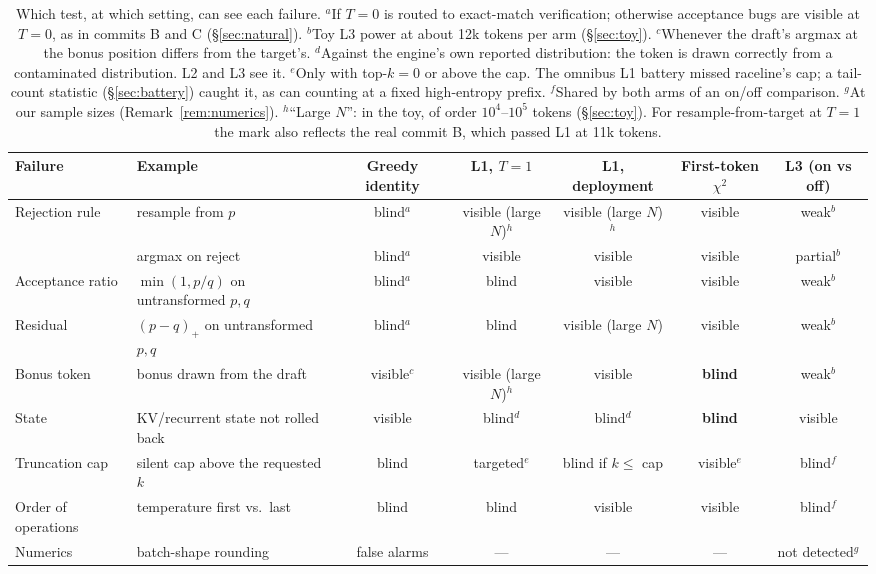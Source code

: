 \documentclass[10pt]{article}
\theoremstyle{remark}
\begin{document}
\begin{table}[h]
\centering\small
\begin{tabular}{llccccc}
\toprule
Failure & Example & Greedy identity & L1, $T{=}1$ & L1, deployment & First-token $\chi^2$ & L3 (on vs off) \\
\midrule
Rejection rule & resample from $p$ & blind$^a$ & visible (large $N$)$^h$ & visible (large $N$)$^h$ & visible & weak$^b$ \\
 & argmax on reject & blind$^a$ & visible & visible & visible & partial$^b$ \\
Acceptance ratio & $\min(1,p/q)$ on untransformed $p,q$ & blind$^a$ & blind & visible & visible & weak$^b$ \\
Residual & $(p-q)_+$ on untransformed $p,q$ & blind$^a$ & blind & visible (large $N$) & visible & weak$^b$ \\
Bonus token & bonus drawn from the draft & visible$^c$ & visible (large $N$)$^h$ & visible & \textbf{blind} & weak$^b$ \\
State & KV/recurrent state not rolled back & visible & blind$^d$ & blind$^d$ & \textbf{blind} & visible \\
Truncation cap & silent cap above the requested $k$ & blind & targeted$^e$ & blind if $k\le$ cap & visible$^e$ & blind$^f$ \\
Order of operations & temperature first vs.\ last & blind & blind & visible & visible & blind$^f$ \\
Numerics & batch-shape rounding & false alarms & --- & --- & --- & not detected$^g$ \\
\bottomrule
\end{tabular}
\caption{Which test, at which setting, can see each failure.
$^a$If $T{=}0$ is routed to exact-match verification; otherwise acceptance bugs are visible at $T{=}0$, as in commits B and C (\S\ref{sec:natural}).
$^b$Toy L3 power at about 12k tokens per arm (\S\ref{sec:toy}).
$^c$Whenever the draft's argmax at the bonus position differs from the target's.
$^d$Against the engine's own reported distribution: the token is drawn correctly from a contaminated distribution. L2 and L3 see it.
$^e$Only with top-$k{=}0$ or above the cap. The omnibus L1 battery missed raceline's cap; a tail-count statistic (\S\ref{sec:battery}) caught it, as can counting at a fixed high-entropy prefix.
$^f$Shared by both arms of an on/off comparison.
$^g$At our sample sizes (Remark~\ref{rem:numerics}).
$^h$``Large $N$'': in the toy, of order $10^4$--$10^5$ tokens (\S\ref{sec:toy}). For resample-from-target at $T{=}1$ the mark also reflects the real commit B, which passed L1 at 11k tokens.}\label{tab:taxonomy}
\end{table}
\end{document}
